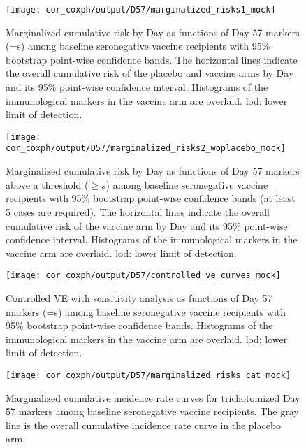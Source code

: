 \documentclass[]{book}
\theoremstyle{definition}
\theoremstyle{definition}
\theoremstyle{definition}
\newcommand{\1}{\mathbbm{1}}
\begin{document}
\begin{figure}[H]
    \centering
    \texttt{[image: cor\_coxph/output/D57/marginalized\_risks1\_mock]}
    \caption{Marginalized cumulative risk by Day \protect as functions of Day 57 markers (=s) among baseline seronegative vaccine recipients with 95\% bootstrap point-wise confidence bands. The horizontal lines indicate the overall cumulative risk of the placebo and vaccine arms by Day \protect and its 95\% point-wise confidence interval. Histograms of the immunological markers in the vaccine arm are overlaid. lod: lower limit of detection.}
\end{figure}
\begin{figure}[H]
    \centering
    \texttt{[image: cor\_coxph/output/D57/marginalized\_risks2\_woplacebo\_mock]}
    \caption{Marginalized cumulative risk by Day \protect as functions of Day 57 markers above a threshold ($\geq s$) among baseline seronegative vaccine recipients with 95\% bootstrap point-wise confidence bands (at least 5 cases are required). The horizontal lines indicate the overall cumulative risk of the vaccine arm by Day \protect and its 95\% point-wise confidence interval. Histograms of the immunological markers in the vaccine arm are overlaid. lod: lower limit of detection.}
\end{figure}
\begin{figure}[H]
    \centering
    \texttt{[image: cor\_coxph/output/D57/controlled\_ve\_curves\_mock]}
    \caption{Controlled VE with sensitivity analysis as functions of Day 57 markers (=s) among baseline seronegative vaccine recipients with 95\% bootstrap point-wise confidence bands. Histograms of the immunological markers in the vaccine arm are overlaid. lod: lower limit of detection.}
\end{figure}

\begin{figure}[H]
    \centering
    \texttt{[image: cor\_coxph/output/D57/marginalized\_risks\_cat\_mock]}
    \caption{Marginalized cumulative incidence rate curves for trichotomized Day 57 markers among baseline seronegative vaccine recipients. The gray line is the overall cumulative incidence rate curve in the placebo arm.}
\end{figure}
\end{document}
